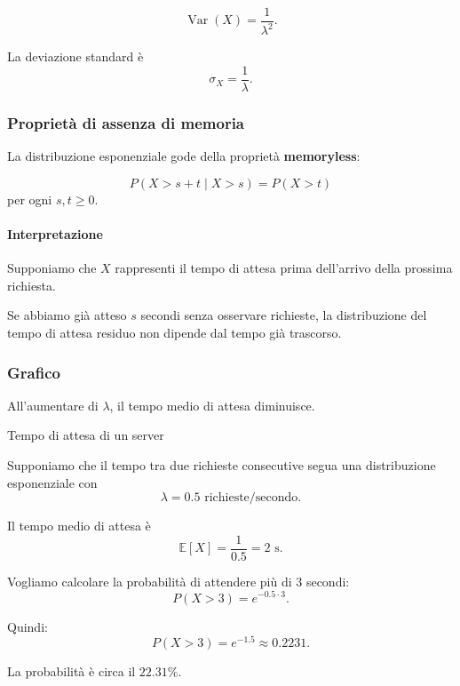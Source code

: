 \[
\boxed{
\operatorname{Var}(X)=\frac1{\lambda^2}.
}
\]

La deviazione standard è
\[
\sigma_X=\frac1\lambda.
\]

\subsubsection{Proprietà di assenza di memoria}

La distribuzione esponenziale
gode della proprietà
\textbf{memoryless}:

\[
\boxed{
P(X>s+t\mid X>s)=P(X>t)
}
\]
per ogni $s,t\geq0$.

\paragraph{Interpretazione}

Supponiamo che $X$ rappresenti
il tempo di attesa prima
dell'arrivo della prossima richiesta.

Se abbiamo già atteso $s$ secondi
senza osservare richieste,
la distribuzione del tempo
di attesa residuo
non dipende dal tempo già trascorso.

\subsubsection{Grafico}

\begin{center}
\end{center}

All'aumentare di $\lambda$,
il tempo medio di attesa diminuisce.

\begin{example}{Tempo di attesa di un server}

Supponiamo che il tempo tra
due richieste consecutive
segua una distribuzione esponenziale
con
\[
\lambda=0.5\text{ richieste/secondo}.
\]

Il tempo medio di attesa è
\[
\mathbb{E}[X]=\frac1{0.5}=2\text{ s}.
\]

Vogliamo calcolare
la probabilità di attendere
più di 3 secondi:
\[
P(X>3)=e^{-0.5\cdot3}.
\]

Quindi:
\[
\boxed{
P(X>3)=e^{-1.5}\approx0.2231.
}
\]

La probabilità è circa il $22.31\%$.
\end{example}


